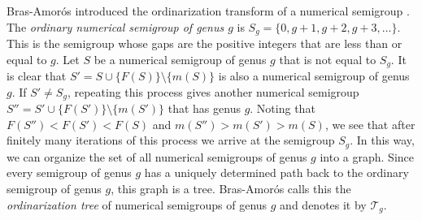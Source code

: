 \documentclass[12pt]{amsart}
\newcommand{\T}{{\mathcal T}}
\theoremstyle{plain}\newtheorem{proposition}{Proposition}[section]
\begin{document}
Bras-Amor\'os introduced the ordinarization transform of a numerical semigroup \cite{Bras-Amoros_ord}.  The \emph{ordinary numerical semigroup of genus $g$} is $S_g = \{0,g+1,g+2,g+3,\ldots\}$.  This is the semigroup whose gaps are the positive integers that are less than or equal to $g$.  Let $S$ be a numerical semigroup of genus $g$ that is not equal to $S_g$.  It is clear that $S' = S \cup \{F(S)\} \setminus \{m(S)\}$ is also a numerical semigroup of genus $g$.  If $S' \neq S_g$, repeating this process gives another numerical semigroup $S'' = S' \cup \{F(S')\} \setminus \{m(S')\}$ that has genus $g$.  Noting that $F(S'') < F(S') < F(S)$ and $m(S'') > m(S') > m(S)$, we see that after finitely many iterations of this process we arrive at the semigroup $S_g$.  In this way, we can organize the set of all numerical semigroups of genus $g$ into a graph.  Since every semigroup of genus $g$ has a uniquely determined path back to the ordinary semigroup of genus $g$, this graph is a tree. Bras-Amor\'os calls this the \emph{ordinarization tree} of numerical semigroups of genus $g$ and denotes it by $\T_g$.
\end{document}
